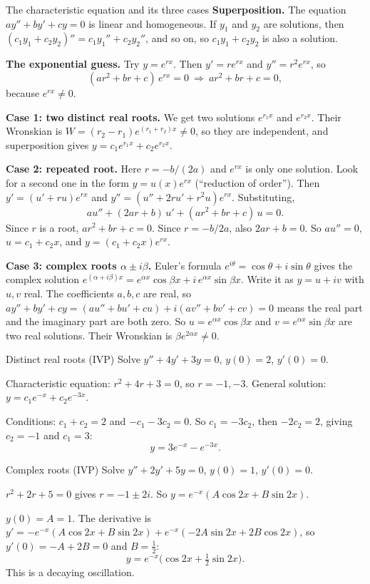 \begin{derivbox}{The characteristic equation and its three cases}
\textbf{Superposition.} The equation $ay''+by'+cy=0$ is linear and homogeneous. If $y_1$ and $y_2$ are solutions, then $(c_1y_1 + c_2y_2)'' = c_1y_1'' + c_2y_2''$, and so on, so $c_1y_1 + c_2y_2$ is also a solution.

\textbf{The exponential guess.} Try $y = e^{rx}$. Then $y' = re^{rx}$ and $y'' = r^2e^{rx}$, so
\[ (ar^2 + br + c)\,e^{rx} = 0 \ \Longrightarrow\ ar^2 + br + c = 0, \]
because $e^{rx}\neq0$.

\textbf{Case 1: two distinct real roots.} We get two solutions $e^{r_1x}$ and $e^{r_2x}$. Their Wronskian is $W = (r_2 - r_1)e^{(r_1+r_2)x}\neq0$, so they are independent, and superposition gives $y = c_1e^{r_1x} + c_2e^{r_2x}$.

\textbf{Case 2: repeated root.} Here $r = -b/(2a)$ and $e^{rx}$ is only one solution. Look for a second one in the form $y = u(x)e^{rx}$ (``reduction of order''). Then $y' = (u' + ru)e^{rx}$ and $y'' = (u'' + 2ru' + r^2u)e^{rx}$. Substituting,
\[ a u'' + (2ar + b)\,u' + (ar^2 + br + c)\,u = 0 . \]
Since $r$ is a root, $ar^2+br+c = 0$. Since $r = -b/2a$, also $2ar + b = 0$. So $au''=0$, $u = c_1 + c_2x$, and $y = (c_1 + c_2x)e^{rx}$.

\textbf{Case 3: complex roots $\alpha\pm i\beta$.} Euler's formula $e^{i\theta} = \cos\theta + i\sin\theta$ gives the complex solution $e^{(\alpha+i\beta)x} = e^{\alpha x}\cos\beta x + i\,e^{\alpha x}\sin\beta x$. Write it as $y = u + iv$ with $u,v$ real. The coefficients $a,b,c$ are real, so $a y''+by'+cy = (au''+bu'+cu) + i(av''+bv'+cv) = 0$ means the real part and the imaginary part are both zero. So $u = e^{\alpha x}\cos\beta x$ and $v = e^{\alpha x}\sin\beta x$ are two real solutions. Their Wronskian is $\beta e^{2\alpha x}\neq0$.
\end{derivbox}

\begin{examplebox}{Distinct real roots (IVP)}
Solve $y'' + 4y' + 3y = 0$, \; $y(0)=2$, \; $y'(0)=0$.

Characteristic equation: $r^2 + 4r + 3 = 0$, so $r = -1, -3$. General solution: $y = c_1e^{-x} + c_2e^{-3x}$.

Conditions: $c_1 + c_2 = 2$ and $-c_1 - 3c_2 = 0$. So $c_1 = -3c_2$, then $-2c_2 = 2$, giving $c_2=-1$ and $c_1 = 3$:
\[ y = 3e^{-x} - e^{-3x}. \]
\end{examplebox}

\begin{examplebox}{Complex roots (IVP)}
Solve $y'' + 2y' + 5y = 0$, \; $y(0)=1$, \; $y'(0)=0$.

$r^2 + 2r + 5 = 0$ gives $r = -1 \pm 2i$. So $y = e^{-x}(A\cos 2x + B\sin 2x)$.

$y(0) = A = 1$. The derivative is $y' = -e^{-x}(A\cos 2x + B\sin 2x) + e^{-x}(-2A\sin 2x + 2B\cos 2x)$, so $y'(0) = -A + 2B = 0$ and $B = \tfrac12$:
\[ y = e^{-x}\Big(\cos 2x + \tfrac12\sin 2x\Big). \]
This is a decaying oscillation.
\end{examplebox}

